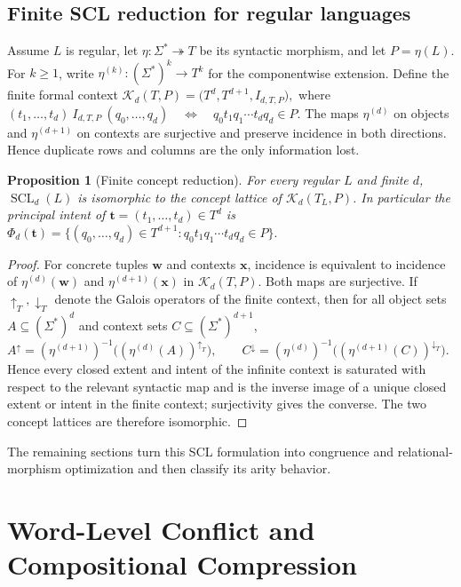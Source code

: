\documentclass[10pt,a4paper]{article}
\newtheorem{proposition}[theorem]{Proposition}
\theoremstyle{definition}
\theoremstyle{remark}
\newcommand{\SCL}{\operatorname{SCL}}
\begin{document}
\subsection{Finite SCL reduction for regular languages}

Assume \(L\) is regular, let \(\eta:\Sigma^*\twoheadrightarrow T\) be its
syntactic morphism, and let \(P=\eta(L)\).  For \(k\ge1\), write
\(\eta^{(k)}:(\Sigma^*)^k\to T^k\) for the componentwise extension.  Define
the finite formal context
\(
 \mathcal K_d(T,P)=\bigl(T^d,T^{d+1},I_{d,T,P}\bigr),
\)
where
\(
 (t_1,\ldots,t_d)\ I_{d,T,P}\ (q_0,\ldots,q_d)
 \quad\Longleftrightarrow\quad
 q_0t_1q_1\cdots t_dq_d\in P.
\)
The maps \(\eta^{(d)}\) on objects and \(\eta^{(d+1)}\) on contexts are surjective
and preserve incidence in both directions.  Hence duplicate rows and columns
are the only information lost.

\begin{proposition}[Finite concept reduction]
\label{scl:prop:finite-reduction}
For every regular \(L\) and finite \(d\), \(\SCL_d(L)\) is isomorphic to the
concept lattice of \(\mathcal K_d(T_L,P)\).  In particular the principal
intent of \(\mathbf t=(t_1,\ldots,t_d)\in T^d\) is
\(
 \Phi_d(\mathbf t)
 =\{(q_0,\ldots,q_d)\in T^{d+1}:q_0t_1q_1\cdots t_dq_d\in P\}.
\)
\end{proposition}
\begin{proof}
For concrete tuples \(\mathbf w\) and contexts \(\mathbf x\), incidence is
equivalent to incidence of \(\eta^{(d)}(\mathbf w)\) and
\(\eta^{(d+1)}(\mathbf x)\) in \(\mathcal K_d(T,P)\).  Both maps are
surjective.  If \(\uparrow_T,\downarrow_T\) denote the Galois operators of the
finite context, then for all object sets \(A\subseteq(\Sigma^*)^d\) and context
sets \(C\subseteq(\Sigma^*)^{d+1}\),
\(A^\uparrow = (\eta^{(d+1)})^{-1}\!\bigl((\eta^{(d)}(A))^{\uparrow_T}\bigr), \qquad C^\downarrow = (\eta^{(d)})^{-1}\!\bigl((\eta^{(d+1)}(C))^{\downarrow_T}\bigr).\)
Hence every closed extent and intent of the infinite context is saturated with
respect to the relevant syntactic map and is the inverse image of a unique
closed extent or intent in the finite context; surjectivity gives the converse.
The two concept lattices are therefore isomorphic.
\end{proof}

The remaining sections turn this SCL formulation into congruence and
relational-morphism optimization and then classify its arity behavior.

\section{Word-Level Conflict and Compositional Compression}
\label{sec:conflict}
\end{document}
